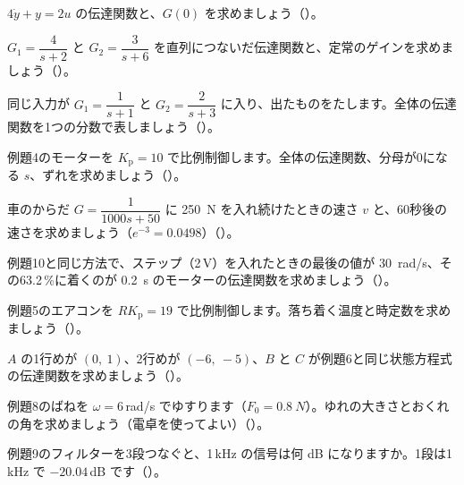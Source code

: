 \bkproblem $4\dot y+y=2u$ の伝達関数と、$G(0)$ を求めましょう\mbox{（）}。

\bkproblem $G_1=\dfrac{4}{s+2}$ と $G_2=\dfrac{3}{s+6}$ を直列につないだ伝達関数と、定常のゲインを求めましょう\mbox{（）}。

\bkproblem 同じ入力が $G_1=\dfrac{1}{s+1}$ と $G_2=\dfrac{2}{s+3}$ に入り、出たものをたします。全体の伝達関数を1つの分数で表しましょう\mbox{（）}。

\bkproblem 例題4のモーターを $K_{\mathrm p}=10$ で比例制御します。全体の伝達関数、分母が0になる $s$、ずれを求めましょう\mbox{（）}。

\bkproblem 車のからだ $G=\dfrac{1}{1000s+50}$ に \qty{250}{N} を入れ続けたときの速さ $v$ と、60秒後の速さを求めましょう（$e^{-3}=0.0498$）\mbox{（）}。

\bkproblem 例題10と同じ方法で、ステップ（2\,V）を入れたときの最後の値が \qty{30}{rad/s}、その63.2\,\%に着くのが \qty{0.2}{s} のモーターの伝達関数を求めましょう\mbox{（）}。


\bkproblem 例題5のエアコンを $RK_{\mathrm p}=19$ で比例制御します。落ち着く温度と時定数を求めましょう\mbox{（）}。

\bkproblem $A$ の1行めが $(0,\ 1)$、2行めが $(-6,\ -5)$、$B$ と $C$ が例題6と同じ状態方程式の伝達関数を求めましょう\mbox{（）}。

\bkproblem 例題8のばねを $\omega=6$\,rad/s でゆすります（$F_0=\qty{0.8}{N}$）。ゆれの大きさとおくれの角を求めましょう（電卓を使ってよい）\mbox{（）}。

\bkproblem 例題9のフィルターを3段つなぐと、1\,kHz の信号は何 dB になりますか。1段は1\,kHz で $-20.04$\,dB です\mbox{（）}。

